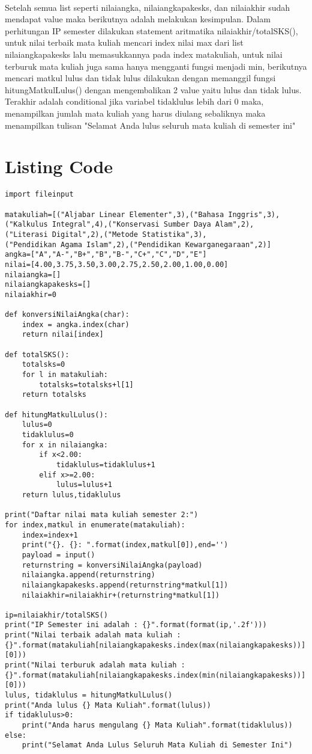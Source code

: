 \documentclass[a4paper]{article}
\begin{document}
\paragraph{}
Setelah semua list seperti nilaiangka, nilaiangkapakesks, dan nilaiakhir sudah mendapat value maka berikutnya adalah melakukan kesimpulan. Dalam perhitungan IP semester dilakukan statement aritmatika nilaiakhir/totalSKS(), untuk nilai terbaik mata kuliah mencari index nilai max dari list nilaiangkapakesks lalu memasukkannya pada index matakuliah, untuk nilai terburuk mata kuliah juga sama hanya mengganti fungsi menjadi min, berikutnya mencari matkul lulus dan tidak lulus dilakukan dengan memanggil fungsi hitungMatkulLulus() dengan mengembalikan 2 value yaitu lulus dan tidak lulus. Terakhir adalah conditional jika variabel tidaklulus lebih dari 0 maka, menampilkan jumlah mata kuliah yang harus diulang sebaliknya maka menampilkan tulisan "Selamat Anda lulus seluruh mata kuliah di semester ini"

\section{Listing Code}
\begin{lstlisting}
import fileinput

matakuliah=[("Aljabar Linear Elementer",3),("Bahasa Inggris",3),
("Kalkulus Integral",4),("Konservasi Sumber Daya Alam",2),
("Literasi Digital",2),("Metode Statistika",3),
("Pendidikan Agama Islam",2),("Pendidikan Kewarganegaraan",2)]
angka=["A","A-","B+","B","B-","C+","C","D","E"]
nilai=[4.00,3.75,3.50,3.00,2.75,2.50,2.00,1.00,0.00]
nilaiangka=[]
nilaiangkapakesks=[]
nilaiakhir=0

def konversiNilaiAngka(char):
    index = angka.index(char)
    return nilai[index]

def totalSKS():
    totalsks=0
    for l in matakuliah:
        totalsks=totalsks+l[1]
    return totalsks

def hitungMatkulLulus():
    lulus=0
    tidaklulus=0
    for x in nilaiangka:
        if x<2.00:
            tidaklulus=tidaklulus+1
        elif x>=2.00:
            lulus=lulus+1
    return lulus,tidaklulus

print("Daftar nilai mata kuliah semester 2:")
for index,matkul in enumerate(matakuliah):
    index=index+1
    print("{}. {}: ".format(index,matkul[0]),end='')
    payload = input()
    returnstring = konversiNilaiAngka(payload)
    nilaiangka.append(returnstring)
    nilaiangkapakesks.append(returnstring*matkul[1])
    nilaiakhir=nilaiakhir+(returnstring*matkul[1])

ip=nilaiakhir/totalSKS()
print("IP Semester ini adalah : {}".format(format(ip,'.2f')))
print("Nilai terbaik adalah mata kuliah :
{}".format(matakuliah[nilaiangkapakesks.index(max(nilaiangkapakesks))][0]))
print("Nilai terburuk adalah mata kuliah :
{}".format(matakuliah[nilaiangkapakesks.index(min(nilaiangkapakesks))][0]))
lulus, tidaklulus = hitungMatkulLulus()
print("Anda lulus {} Mata Kuliah".format(lulus))
if tidaklulus>0:
    print("Anda harus mengulang {} Mata Kuliah".format(tidaklulus))
else:
    print("Selamat Anda Lulus Seluruh Mata Kuliah di Semester Ini")

\end{lstlisting}
\end{document}
